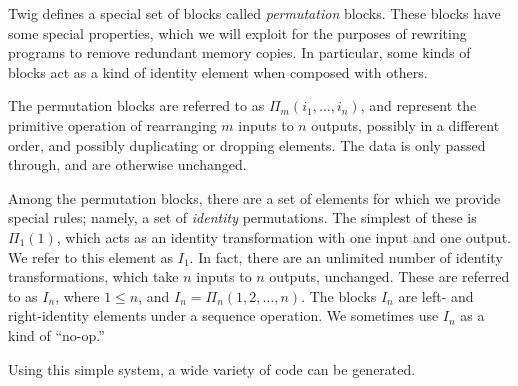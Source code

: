Twig defines a special set of blocks called \emph{permutation} blocks. These blocks have some special properties, which we will exploit for the purposes of rewriting programs to remove redundant memory copies. In particular, some kinds of blocks act as a kind of identity element when composed with others.

The permutation blocks are referred to as $\Pi_m(i_1,\ldots,i_n)$, and represent the primitive operation of rearranging $m$ inputs to $n$ outputs, possibly in a different order, and possibly duplicating or dropping elements. The data is only passed through, and are otherwise unchanged.

Among the permutation blocks, there are a set of elements for which we provide special rules; namely, a set of \emph{identity} permutations. The simplest of these is $\Pi_1(1)$, which acts as an identity transformation with one input and one output. We refer to this element as $I_1$. In fact, there are an unlimited number of identity transformations, which take $n$ inputs to $n$ outputs, unchanged. These are referred to as $I_n$, where $1 \leq n$, and $I_n = \Pi_n(1,2,\ldots,n)$. The blocks $I_n$ are left- and right-identity elements under a sequence operation. We sometimes use $I_n$ as a kind of ``no-op.''

Using this simple system, a wide variety of code can be generated.


